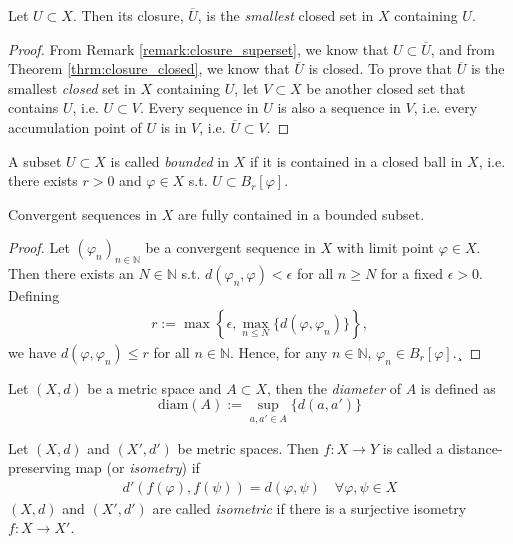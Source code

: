 \begin{theorem}
	Let $U\subset X$. Then its closure, $\overline{U}$, is the \textit{smallest} closed set in $X$ containing $U$.
\end{theorem}

\begin{proof}
	From Remark \ref{remark:closure_superset}, we know that $U\subset \overline{U}$, and from Theorem \ref{thrm:closure_closed}, we know that $\overline{U}$ is closed. To prove that $\overline{U}$ is the smallest \textit{closed} set in $X$ containing $U$, let $V\subset X$ be another closed set that contains $U$, i.e. $U\subset V$. Every sequence in $U$ is also a sequence in $V$, i.e. every accumulation point of $U$ is in $V$, i.e. $\overline{U}\subset V$.
\end{proof}

\begin{defn}\label{defn:bounded_set}
	A subset $U\subset X$ is called \textit{bounded} in $X$ if it is contained in a closed ball in $X$, i.e. there exists $r > 0$ and $\varphi \in X$ s.t. $U\subset B_{r}[\varphi]$.
\end{defn}

\begin{theorem}
	Convergent sequences in $X$ are fully contained in a bounded subset.
\end{theorem}

\begin{proof}
	Let $(\varphi_n)_{n\in\mathbb N}$ be a convergent sequence in $X$ with limit point $\varphi\in X$. Then there exists an $N\in\mathbb N$ s.t. $d(\varphi_n, \varphi) < \epsilon$ for all $n\geq N$ for a fixed $\epsilon > 0$. Defining
	\begin{align}
		r := \max \left\{ \epsilon, \max_{n \leq N}\{d(\varphi, \varphi_n)\} \right\},
	\end{align}
	we have $d(\varphi, \varphi_n) \leq r$ for all $n\in\mathbb N$. Hence, for any $n\in\mathbb N$, 
	$\varphi_n\in B_{r}[\varphi]$.¸
\end{proof}

\begin{defn}\label{defn:diameter_metric_set}
	Let $(X, d)$ be a metric space and $A\subset X$, then the \textit{diameter} of $A$ is defined as
	$$\text{diam}(A) := \sup_{a, a'\in A}\{d(a, a')\}$$
\end{defn}

\begin{defn}[Isometry]
	Let $(X, d)$ and $(X', d')$ be metric spaces. Then $f: X \rightarrow Y$ is called a distance-preserving map (or \textit{isometry}) if
	\begin{align}
		d'(f(\varphi), f(\psi)) = d(\varphi, \psi) \quad\forall \varphi, \psi\in X
	\end{align}
	$(X, d)$ and $(X', d')$ are called \textit{isometric} if there is a surjective isometry $f:X\rightarrow X'$.
\end{defn}

